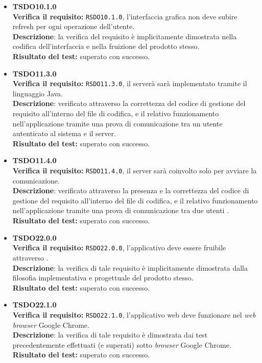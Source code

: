 \begin{itemize}
\item \textbf{TSDO10.1.0}\\
\textbf{Verifica il requisito:} \texttt{RSDO10.1.0}, l'interfaccia grafica non deve subire refresh per ogni operazione dell'utente.\\
\textbf{Descrizione}: la verifica del requisito è implicitamente dimostrata nella codifica dell'interfaccia e nella fruizione del prodotto stesso.\\
\textbf{Risultato del test:} superato con successo.

\item \textbf{TSDO11.3.0}\\
\textbf{Verifica il requisito:} \texttt{RSDO11.3.0}, il serverà sarà implementato tramite il linguaggio Java.\\
\textbf{Descrizione}: verificato attraverso la correttezza del codice di gestione del requisito all'interno del file di codifica, e il relativo funzionamento nell'applicazione tramite una prova di comunicazione tra un utente autenticato al sistema e il server.\\
\textbf{Risultato del test:} superato con successo.

\item \textbf{TSDO11.4.0}\\
\textbf{Verifica il requisito:} \texttt{RSDO11.4.0}, il server sarà coinvolto solo per avviare la comunicazione.\\
\textbf{Descrizione}: verificato attraverso la presenza e la correttezza del codice di gestione del requisito all'interno del file di codifica, e il relativo funzionamento nell'applicazione tramite una prova di comunicazione tra due utenti .\\
\textbf{Risultato del test:} superato con successo.

\item \textbf{TSDO22.0.0}\\
\textbf{Verifica il requisito:} \texttt{RSDO22.0.0}, l'applicativo deve essere fruibile attraverso .\\
\textbf{Descrizione}: la verifica di tale requisito è implicitamente dimostrata dalla filosofia implementativa e progettuale del prodotto stesso.\\
\textbf{Risultato del test:} superato con successo.

\item \textbf{TSDO22.1.0}\\
\textbf{Verifica il requisito:} \texttt{RSDO22.1.0}, l'applicativo web deve funzionare nel \textit{web browser} Google Chrome.\\
\textbf{Descrizione}: la verifica di tale requisito è dimostrata dai test precedentemente effettuati (e superati) sotto \textit{browser} Google Chrome.
\textbf{Risultato del test:} superato con successo.


\end{itemize}
